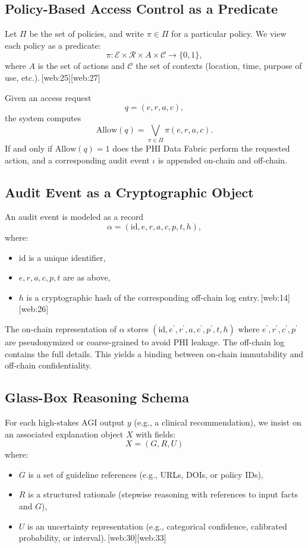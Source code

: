 \documentclass[11pt]{article}
\begin{document}
\subsection{Policy-Based Access Control as a Predicate}

Let $\Pi$ be the set of policies, and write $\pi \in \Pi$ for a particular policy. 
We view each policy as a predicate:
\[
  \pi : \mathcal{E} \times \mathcal{R} \times A \times \mathcal{C} \to \{0, 1\},
\]
where $A$ is the set of actions and $\mathcal{C}$ the set of contexts (location, time, purpose of use, etc.).\,[web:25][web:27]

Given an access request
\[
  q = (e, r, a, c),
\]
the system computes
\[
  \text{Allow}(q) = \bigvee_{\pi \in \Pi} \pi(e, r, a, c).
\]
If and only if $\text{Allow}(q) = 1$ does the PHI Data Fabric perform the requested action, and a corresponding audit event $\iota$ is appended on-chain and off-chain.

\subsection{Audit Event as a Cryptographic Object}

An audit event is modeled as a record
\[
  \alpha = (\text{id}, e, r, a, c, p, t, h),
\]
where:
\begin{itemize}[nosep]
  \item $\text{id}$ is a unique identifier,
  \item $e, r, a, c, p, t$ are as above,
  \item $h$ is a cryptographic hash of the corresponding off-chain log entry.\,[web:14][web:26]
\end{itemize}

The on-chain representation of $\alpha$ stores $(\text{id}, e^\prime, r^\prime, a, c^\prime, p^\prime, t, h)$ where $e^\prime, r^\prime, c^\prime, p^\prime$ are pseudonymized or coarse-grained to avoid PHI leakage. 
The off-chain log contains the full details. 
This yields a binding between on-chain immutability and off-chain confidentiality.

\subsection{Glass-Box Reasoning Schema}

For each high-stakes AGI output $y$ (e.g., a clinical recommendation), we insist on an associated explanation object $X$ with fields:
\[
  X = (G, R, U)
\]
where:
\begin{itemize}[nosep]
  \item $G$ is a set of guideline references (e.g., URLs, DOIs, or policy IDs),
  \item $R$ is a structured rationale (stepwise reasoning with references to input facts and $G$),
  \item $U$ is an uncertainty representation (e.g., categorical confidence, calibrated probability, or interval).\,[web:30][web:33]
\end{itemize}
\end{document}
